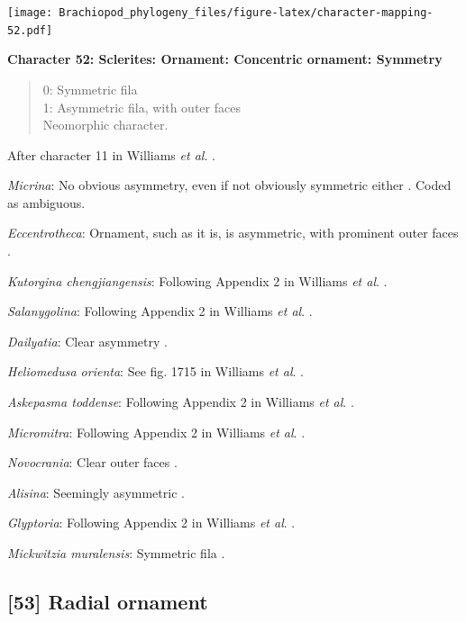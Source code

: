 \documentclass[]{book}
\theoremstyle{definition}
\theoremstyle{definition}
\theoremstyle{definition}
\theoremstyle{remark}
\begin{document}
\texttt{[image: Brachiopod\_phylogeny\_files/figure-latex/character-mapping-52.pdf]}

\textbf{Character 52: Sclerites: Ornament: Concentric ornament:
Symmetry}

\begin{quote}
0: Symmetric fila\\
1: Asymmetric fila, with outer faces\\
Neomorphic character.
\end{quote}

After character 11 in Williams \emph{et al}.
\citeyearpar{Williams1998Thediversity}.

\emph{Micrina}: No obvious asymmetry, even if not obviously symmetric
either \citep{Holmer2008TheEarly}. Coded as ambiguous.

\emph{Eccentrotheca}: Ornament, such as it is, is asymmetric, with
prominent outer faces \citep{Skovsted2011Scleritomeconstruction}.

\emph{Kutorgina chengjiangensis}: Following Appendix 2 in Williams
\emph{et al}. \citeyearpar{Williams1998Thediversity}.

\emph{Salanygolina}: Following Appendix 2 in Williams \emph{et al}.
\citeyearpar{Williams1998Thediversity}.

\emph{Dailyatia}: Clear asymmetry \citep{Skovsted2015Theearly}.

\emph{Heliomedusa orienta}: See fig. 1715 in Williams \emph{et al}.
\citeyearpar{Williams2007PartH}.

\emph{Askepasma toddense}: Following Appendix 2 in Williams \emph{et
al}. \citeyearpar{Williams1998Thediversity}.

\emph{Micromitra}: Following Appendix 2 in Williams \emph{et al}.
\citeyearpar{Williams1998Thediversity}.

\emph{Novocrania}: Clear outer faces \citep[fig.
100.2b]{Williams2000BrachiopodaLinguliformea}.

\emph{Alisina}: Seemingly asymmetric \citetext{\citealp[fig.
122.3c]{Williams2000BrachiopodaLinguliformea}; \citealp[Fig.
1]{Zhang2011Anobolellate}}.

\emph{Glyptoria}: Following Appendix 2 in Williams \emph{et al}.
\citeyearpar{Williams1998Thediversity}.

\emph{Mickwitzia muralensis}: Symmetric fila
\citep{Balthasar2004Shellstructure}.

\hypertarget{radial-ornament}{%
\subsection*{{[}53{]} Radial ornament}\label{radial-ornament}}
\end{document}
